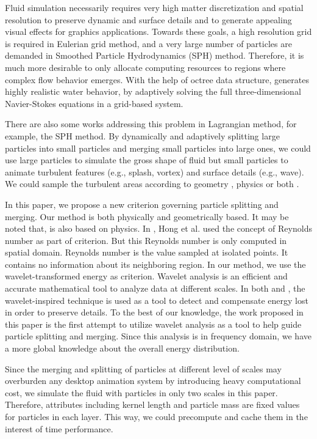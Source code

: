 Fluid simulation necessarily requires very high matter discretization
and spatial resolution to preserve dynamic and surface details and to
generate appealing visual effects for graphics applications. Towards
these goals, a high resolution grid is required in Eulerian grid
method, and a very large number of particles are demanded in Smoothed
Particle Hydrodynamics (SPH) method. Therefore, it is much more
desirable to only allocate computing resources to regions where
complex flow behavior emerges. With the help of octree data structure,
\cite{Losasso:2004:SWS:1015706.1015745} generates highly realistic
water behavior, by adaptively solving the full three-dimensional
Navier-Stokes equations in a grid-based system.

There are also some works addressing this problem in Lagrangian
method, for example, the SPH method. By dynamically and adaptively
splitting large particles into small particles and merging small
particles into large ones, we could use large particles to simulate
the gross shape of fluid but small particles to animate turbulent
features (e.g., splash, vortex) and surface details (e.g., wave). We
could sample the turbulent areas according to geometry
\cite{Adams:2007:ASP:1276377.1276437}, physics
\cite{Hong:2008:API:1394332.1394340} or both
\cite{Yan:2009:RFS:1568678.1568695}.

In this paper, we propose a new criterion governing particle splitting
and merging. Our method is both physically and geometrically based. It
may be noted that, \cite{Hong:2008:API:1394332.1394340} is also based
on physics. In \cite{Hong:2008:API:1394332.1394340}, Hong et al. used
the concept of Reynolds number as part of criterion. But this Reynolds
number is only computed in spatial domain. Reynolds number is the
value sampled at isolated points. It contains no information about its
neighboring region. In our method, we use the wavelet-transformed
energy as criterion. Wavelet analysis is an efficient and accurate
mathematical tool to analyze data at different scales. In both
\cite{Kim:2008:WTF:1360612.1360649} and \cite{PG2011short:67-72:2011},
the wavelet-inspired technique is used as a tool to detect and
compensate energy lost in order to preserve details. To the best of
our knowledge, the work proposed in this paper is the first attempt to
utilize wavelet analysis as a tool to help guide particle splitting
and merging. Since this analysis is in frequency domain, we have a
more global knowledge about the overall energy distribution.

Since the merging and splitting of particles at different level of
scales may overburden any desktop animation system by introducing
heavy computational cost, we simulate the fluid with particles in only
two scales in this paper. Therefore, attributes including kernel
length and particle mass are fixed values for particles in each layer.
This way, we could precompute and cache them in the interest of time
performance.

